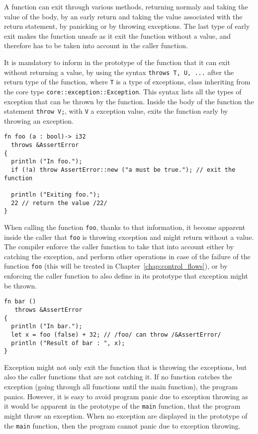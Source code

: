 A function can exit through various methods, returning normaly and taking the
value of the body, by an early return and taking the value associated with the
return statement, by panicking or by throwing exceptions. The last type of early
exit makes the function unsafe as it exit the function without a value, and
therefore has to be taken into account in the caller function.

It is mandatory to inform in the prototype of the function that it can exit
without returning a value, by using the syntax \texttt{throws T, U, ...} after
the return type of the function, where \texttt{T} is a type of exceptions, class
inheriting from the core type \texttt{core::exception::Exception}. This syntax
lists all the types of exception that can be thrown by the function. Inside the
body of the function the statement \texttt{throw V;}, with \texttt{V} a
exception value, exits the function early by throwing an exception.

\begin{lstlisting}[style=coloredverbatim]
fn foo (a : bool)-> i32
  throws &AssertError
{
  println ("In foo.");
  if (!a) throw AssertError::new ("a must be true."); // exit the function

  println ("Exiting foo.");
  22 // return the value /22/
}
\end{lstlisting}


When calling the function \texttt{foo}, thanks to that information, it become
apparent inside the caller that \texttt{foo} is throwing exception and might
return without a value. The compiler enforce the caller function to take that
into account either by catching the exception, and perform other operations in
case of the failure of the function \texttt{foo} (this will be treated in
Chapter~\ref{chap:control_flows}), or by enforcing the caller function to also
define in its prototype that exception might be thrown.


\begin{lstlisting}[style=coloredverbatim]
fn bar ()
   throws &AssertError
{
  println ("In bar.");
  let x = foo (false) + 32; // /foo/ can throw /&AssertError/
  println ("Result of bar : ", x);
}
\end{lstlisting}

Exception might not only exit the function that is throwing the exceptions, but
also the caller functions that are not catching it. If no function catches the
exception (going through all functions until the main function), the program
panics. However, it is easy to avoid program panic due to exception throwing as
it would be apparent in the prototype of the \texttt{main} function, that the
program might throw an exception. When no exception are displayed in the
prototype of the \texttt{main} function, then the program cannot panic due to
exception throwing.


